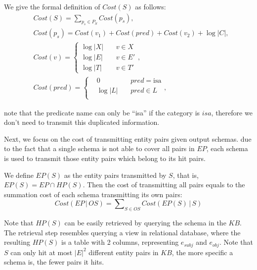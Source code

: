 We give the formal definition of $Cost(S)$ as follows:
\begin{equation}
\label{eqn:costs}
\begin{aligned}
    & Cost(S)      = \sum\nolimits_{p_s \in P_S} Cost(p_s), \\
    & Cost(p_s)    = Cost(v_1) + Cost(pred) + Cost(v_2) + \log{|C|}, \\
    & Cost(v)      = \left\{
        \begin{aligned}
        \log{|X|} & ~     & v \in X  \\
        \log{|E|} & ~     & v \in E' \\
        \log{|T|} & ~     & v \in T'
        \end{aligned}
    \right., \\
    & Cost(pred)   = \left\{
        \begin{aligned}
        & 0         & ~     & pred = \text{isa}  \\
        & \log{|L|} & ~     & pred \in L \\
        \end{aligned}
    \right.,
\end{aligned}
\end{equation}

\noindent
note that the predicate name can only be ``isa'' if the category is $isa$,
therefore we don't need to transmit this duplicated information.

Next, we focus on the cost of transmitting entity pairs given output schemas.
due to the fact that a single schema is not able to cover all pairs in $EP$,
each schema is used to transmit those entity pairs which belong to its hit pairs.

We define $EP(S)$ as the entity pairs transmitted by $S$, that is, $EP(S) = EP \cap HP(S)$.
Then the cost of transmitting all pairs equals to the summation cost of each schema
transmitting its own pairs:
\begin{equation}
    Cost(EP\, |\, OS) = \sum\nolimits_{S \in OS} Cost(EP(S)\, |\, S)
\end{equation}

Note that $HP(S)$ can be easily retrieved by querying the schema in the $KB$.
The retrieval step resembles querying a view in relational database,
where the resulting $HP(S)$ is a table with 2 columns, representing $e_{subj}$ and $e_{obj}$.
Note that $S$ can only hit at most $|E|^2$ different entity pairs in $KB$, the more specific
a schema is, the fewer pairs it hits.

